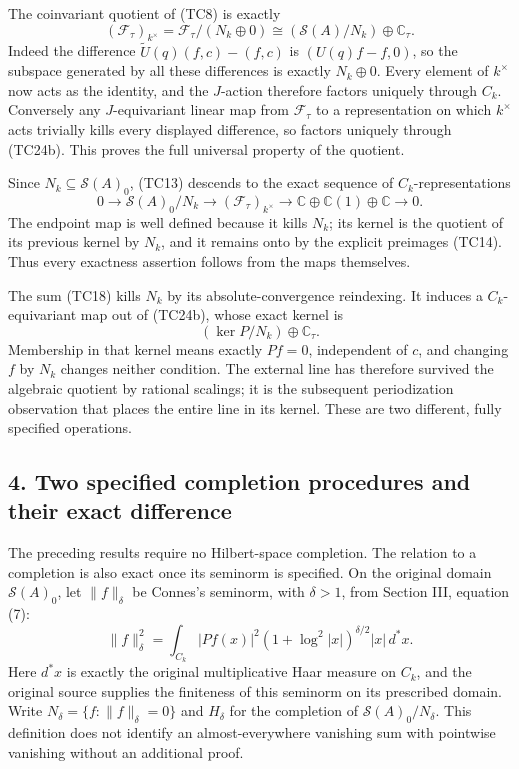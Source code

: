 \documentclass[
  10pt,
]{article}
\begin{document}
The coinvariant quotient of (TC8) is exactly \[
(\mathcal F_\tau)_{k^\times}
=\mathcal F_\tau/(N_k\oplus0)
\cong(\mathcal S(A)/N_k)\oplus\mathbb C_\tau.
\tag{TC24b}
\] Indeed the difference \(\widetilde U(q)(f,c)-(f,c)\) is
\((U(q)f-f,0)\), so the subspace generated by all these differences is
exactly \(N_k\oplus0\). Every element of \(k^\times\) now acts as the
identity, and the \(J\)-action therefore factors uniquely through
\(C_k\). Conversely any \(J\)-equivariant linear map from
\(\mathcal F_\tau\) to a representation on which \(k^\times\) acts
trivially kills every displayed difference, so factors uniquely through
(TC24b). This proves the full universal property of the quotient.

Since \(N_k\subseteq\mathcal S(A)_0\), (TC13) descends to the exact
sequence of \(C_k\)-representations \[
0\longrightarrow\mathcal S(A)_0/N_k
\longrightarrow(\mathcal F_\tau)_{k^\times}
\longrightarrow\mathbb C\oplus\mathbb C(1)\oplus\mathbb C
\longrightarrow0.
\tag{TC24c}
\] The endpoint map is well defined because it kills \(N_k\); its kernel
is the quotient of its previous kernel by \(N_k\), and it remains onto
by the explicit preimages (TC14). Thus every exactness assertion follows
from the maps themselves.

The sum (TC18) kills \(N_k\) by its absolute-convergence reindexing. It
induces a \(C_k\)-equivariant map out of (TC24b), whose exact kernel is
\[
(\ker P/N_k)\oplus\mathbb C_\tau.
\tag{TC24d}
\] Membership in that kernel means exactly \(Pf=0\), independent of
\(c\), and changing \(f\) by \(N_k\) changes neither condition. The
external line has therefore survived the algebraic quotient by rational
scalings; it is the subsequent periodization observation that places the
entire line in its kernel. These are two different, fully specified
operations.

\subsection{4. Two specified completion procedures and their exact
difference}\label{two-specified-completion-procedures-and-their-exact-difference}

The preceding results require no Hilbert-space completion. The relation
to a completion is also exact once its seminorm is specified. On the
original domain \(\mathcal S(A)_0\), let \(\|f\|_\delta\) be Connes's
seminorm, with \(\delta>1\), from Section III, equation (7): \[
\|f\|_\delta^2=
\int_{C_k}|Pf(x)|^2(1+\log^2|x|)^{\delta/2}|x|\,d^*x.
\tag{TC25}
\] Here \(d^*x\) is exactly the original multiplicative Haar measure on
\(C_k\), and the original source supplies the finiteness of this
seminorm on its prescribed domain. Write
\(N_\delta=\{f:\|f\|_\delta=0\}\) and \(H_\delta\) for the completion of
\(\mathcal S(A)_0/N_\delta\). This definition does not identify an
almost-everywhere vanishing sum with pointwise vanishing without an
additional proof.
\end{document}
